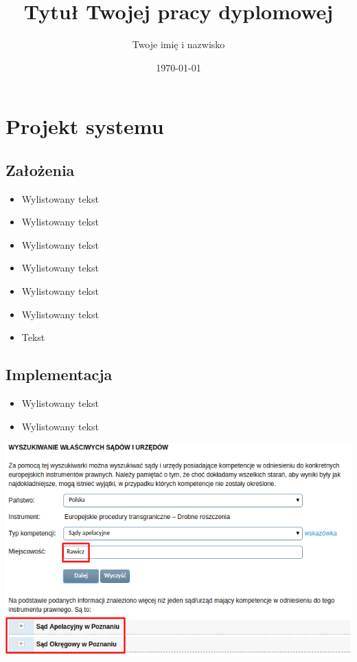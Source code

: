\documentclass[slidestop,red]{beamer}
\title{Tytuł Twojej pracy dyplomowej}
\author{Twoje imię i nazwisko}
\date{\today}
\begin{document}
\frame{\titlepage}


\section{Projekt systemu}

\subsection{Założenia}
\frame
{
	\begin{block}{}
		\begin{itemize}
                    \item Wylistowany tekst
					\item Wylistowany tekst
                    \item Wylistowany tekst
					\item Wylistowany tekst
					\item Wylistowany tekst
					\item Wylistowany tekst
					\item Tekst
        \end{itemize}
        \end{block}

}
\subsection{Implementacja}
\frame
{
	\begin{block}{}
		\begin{itemize}
                    \item Wylistowany tekst
					\item Wylistowany tekst
                \end{itemize}
                \includegraphics[scale=0.4]{rawicz.png}
        \end{block}
}
\end{document}
